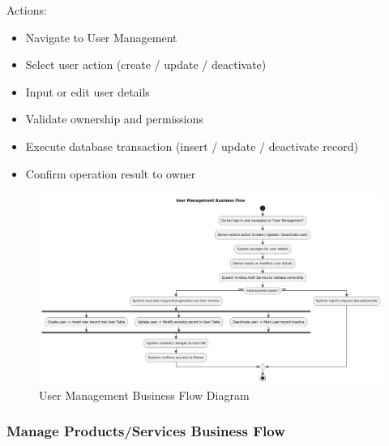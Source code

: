 \documentclass[]{VUMIFTemplateClass}
\begin{document}
Actions:
\begin{itemize}
\setlength{\itemsep}{2pt}
\setlength{\parskip}{0pt}
\setlength{\parsep}{0pt}
\item Navigate to User Management
\item Select user action (create / update / deactivate)
\item Input or edit user details
\item Validate ownership and permissions
\item Execute database transaction (insert / update / deactivate record)
\item Confirm operation result to owner
\end{itemize}

\begin{figure}[H]
    \centering
    \includegraphics[width=1\textwidth]{images/diagrams/business/bpmn_user_manage.png}
    \caption{User Management Business Flow Diagram}
    \label{fig:user_manage_flow}
\end{figure}

\subsubsection{Manage Products/Services Business Flow}
\end{document}
